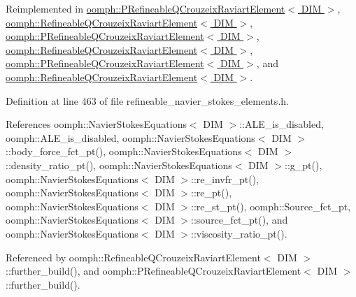 Reimplemented in \hyperlink{classoomph_1_1PRefineableQCrouzeixRaviartElement_a4d5c10a7a11d43c4af08196b95e4803e}{oomph\+::\+P\+Refineable\+Q\+Crouzeix\+Raviart\+Element$<$ D\+I\+M $>$}, \hyperlink{classoomph_1_1RefineableQCrouzeixRaviartElement_aa0cba37e6068fb2a43584bbbd5857a67}{oomph\+::\+Refineable\+Q\+Crouzeix\+Raviart\+Element$<$ D\+I\+M $>$}, \hyperlink{classoomph_1_1PRefineableQCrouzeixRaviartElement_a98e341f00435e0c9b81c0615412bd734}{oomph\+::\+P\+Refineable\+Q\+Crouzeix\+Raviart\+Element$<$ D\+I\+M $>$}, \hyperlink{classoomph_1_1RefineableQCrouzeixRaviartElement_add29acd61fe84a78c19e50096ed944dc}{oomph\+::\+Refineable\+Q\+Crouzeix\+Raviart\+Element$<$ D\+I\+M $>$}, \hyperlink{classoomph_1_1PRefineableQCrouzeixRaviartElement_a3129fe3450caf60d2f678024d7bf7f08}{oomph\+::\+P\+Refineable\+Q\+Crouzeix\+Raviart\+Element$<$ D\+I\+M $>$}, and \hyperlink{classoomph_1_1RefineableQCrouzeixRaviartElement_a96c176f20661f2d18a53a434b0e21b70}{oomph\+::\+Refineable\+Q\+Crouzeix\+Raviart\+Element$<$ D\+I\+M $>$}.



Definition at line 463 of file refineable\+\_\+navier\+\_\+stokes\+\_\+elements.\+h.



References oomph\+::\+Navier\+Stokes\+Equations$<$ D\+I\+M $>$\+::\+A\+L\+E\+\_\+is\+\_\+disabled, oomph\+::\+A\+L\+E\+\_\+is\+\_\+disabled, oomph\+::\+Navier\+Stokes\+Equations$<$ D\+I\+M $>$\+::body\+\_\+force\+\_\+fct\+\_\+pt(), oomph\+::\+Navier\+Stokes\+Equations$<$ D\+I\+M $>$\+::density\+\_\+ratio\+\_\+pt(), oomph\+::\+Navier\+Stokes\+Equations$<$ D\+I\+M $>$\+::g\+\_\+pt(), oomph\+::\+Navier\+Stokes\+Equations$<$ D\+I\+M $>$\+::re\+\_\+invfr\+\_\+pt(), oomph\+::\+Navier\+Stokes\+Equations$<$ D\+I\+M $>$\+::re\+\_\+pt(), oomph\+::\+Navier\+Stokes\+Equations$<$ D\+I\+M $>$\+::re\+\_\+st\+\_\+pt(), oomph\+::\+Source\+\_\+fct\+\_\+pt, oomph\+::\+Navier\+Stokes\+Equations$<$ D\+I\+M $>$\+::source\+\_\+fct\+\_\+pt(), and oomph\+::\+Navier\+Stokes\+Equations$<$ D\+I\+M $>$\+::viscosity\+\_\+ratio\+\_\+pt().



Referenced by oomph\+::\+Refineable\+Q\+Crouzeix\+Raviart\+Element$<$ D\+I\+M $>$\+::further\+\_\+build(), and oomph\+::\+P\+Refineable\+Q\+Crouzeix\+Raviart\+Element$<$ D\+I\+M $>$\+::further\+\_\+build().

\mbox{\label{classoomph_1_1RefineableNavierStokesEquations_ac88134acd65f21845e5fc8e83b89c74a}} 
